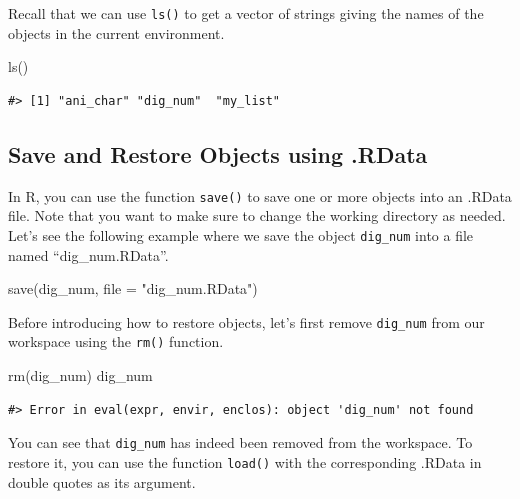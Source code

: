 \documentclass[
]{book}
\newenvironment{Shaded}{\begin{snugshade}}{\end{snugshade}}
\newcommand{\AttributeTok}[1]{\textcolor[rgb]{0.77,0.63,0.00}{#1}}
\newcommand{\FunctionTok}[1]{\textcolor[rgb]{0.00,0.00,0.00}{#1}}
\newcommand{\NormalTok}[1]{#1}
\newcommand{\StringTok}[1]{\textcolor[rgb]{0.31,0.60,0.02}{#1}}
\begin{document}
Recall that we can use \texttt{ls()} to get a vector of strings giving the names of the objects in the current environment.

\begin{Shaded}
\begin{Highlighting}[]
\FunctionTok{ls}\NormalTok{()}
\end{Highlighting}
\end{Shaded}

\begin{verbatim}
#> [1] "ani_char" "dig_num"  "my_list"
\end{verbatim}

\hypertarget{save-and-restore-objects-using-.rdata}{%
\subsection{Save and Restore Objects using .RData}\label{save-and-restore-objects-using-.rdata}}

In R, you can use the function \texttt{save()} to save one or more objects into an .RData file. Note that you want to make sure to change the working directory as needed. Let's see the following example where we save the object \texttt{dig\_num} into a file named ``dig\_num.RData''.

\begin{Shaded}
\begin{Highlighting}[]
\FunctionTok{save}\NormalTok{(dig\_num, }\AttributeTok{file =} \StringTok{"dig\_num.RData"}\NormalTok{)}
\end{Highlighting}
\end{Shaded}

Before introducing how to restore objects, let's first remove \texttt{dig\_num} from our workspace using the \texttt{rm()} function.

\begin{Shaded}
\begin{Highlighting}[]
\FunctionTok{rm}\NormalTok{(dig\_num)}
\NormalTok{dig\_num}
\end{Highlighting}
\end{Shaded}

\begin{verbatim}
#> Error in eval(expr, envir, enclos): object 'dig_num' not found
\end{verbatim}

You can see that \texttt{dig\_num} has indeed been removed from the workspace. To restore it, you can use the function \texttt{load()} with the corresponding .RData in double quotes as its argument.
\end{document}
